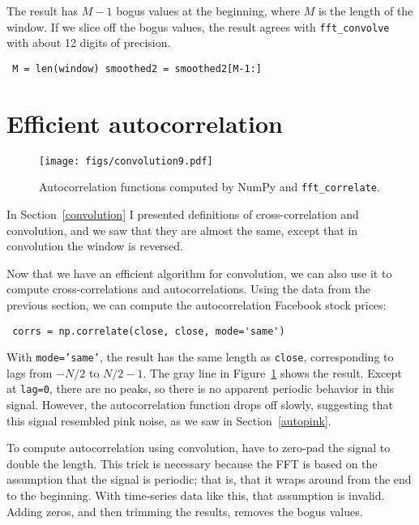 \documentclass[12pt]{book} \usepackage[width=5.5in,height=8.5in, hmarginratio=3:2,vmarginratio=1:1]{geometry}
\begin{document}
The result has $M-1$ bogus values at the beginning, where $M$ is the length of the window. If we slice off the bogus values, the result agrees with \verb"fft_convolve" with about 12 digits of precision. 

\begin{verbatim} M = len(window) smoothed2 = smoothed2[M-1:] \end{verbatim} 

\section{Efficient autocorrelation} 

\begin{figure} 

\centerline{\texttt{[image: figs/convolution9.pdf]}} \caption{Autocorrelation functions computed by NumPy and {\tt fft\_correlate}.} \label{fig.convolution9} \end{figure} 

In Section~\ref{convolution} I presented definitions of cross-correlation and convolution, and we saw that they are almost the same, except that in convolution the window is reversed. 

Now that we have an efficient algorithm for convolution, we can also use it to compute cross-correlations and autocorrelations. Using the data from the previous section, we can compute the autocorrelation Facebook stock prices: 

\begin{verbatim} corrs = np.correlate(close, close, mode='same') \end{verbatim} 

With {\tt mode='same'}, the result has the same length as {\tt close}, corresponding to lags from $-N/2$ to $N/2-1$. The gray line in Figure~\ref{fig.convolution9} shows the result. Except at {\tt lag=0}, there are no peaks, so there is no apparent periodic behavior in this signal. However, the autocorrelation function drops off slowly, suggesting that this signal resembled pink noise, as we saw in Section~\ref{autopink}. 

To compute autocorrelation using convolution, have to zero-pad the signal to double the length. This trick is necessary because the FFT is based on the assumption that the signal is periodic; that is, that it wraps around from the end to the beginning. With time-series data like this, that assumption is invalid. Adding zeros, and then trimming the results, removes the bogus values. 
\end{document}
